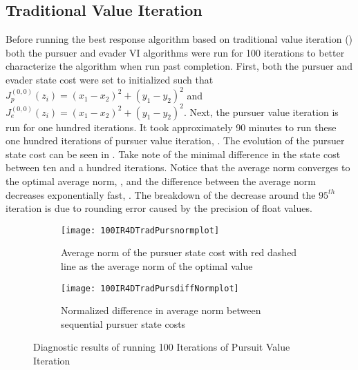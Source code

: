 \subsection{Traditional Value Iteration}
Before running the best response algorithm based on traditional value iteration () both the pursuer and evader VI algorithms were run for 100 iterations to better characterize the algorithm when run past completion. First, both the pursuer and evader state cost were set to initialized such that $J^{(0,0)}_p(z_i) = (x_1-x_2)^2+(y_1-y_2)^2$ and $J^{(0,0)}_e(z_i) = (x_1-x_2)^2+(y_1-y_2)^2$. Next, the pursuer value iteration is run for one hundred iterations. It took approximately 90 minutes to run these one hundred iterations of pursuer value iteration, . The evolution of the pursuer state cost can be seen  in . Take note of the minimal difference in the state cost between ten and a hundred iterations. Notice that the average norm converges to the optimal average norm, , and the difference between the average norm decreases exponentially fast, . The breakdown of the decrease around the $95^{th}$ iteration is due to rounding error caused by the precision of float values.  
\begin{figure}[h!]
\centering
\begin{subfigure}[t]{0.475\textwidth}
	\centering
	\texttt{[image: 100IR4DTradPursnormplot]}
	\caption{Average norm of the pursuer state cost with red dashed line as the average norm of the optimal value}
	\label{100IR4DTnp}
\end{subfigure}
\hfill
\begin{subfigure}[t]{0.475\textwidth}
	\centering
	\texttt{[image: 100IR4DTradPursdiffNormplot]}
	\caption{Normalized difference in average norm between sequential pursuer state costs}
	\label{100IR4DTdnp}
\end{subfigure}
\caption{Diagnostic results of running 100 Iterations of Pursuit Value Iteration}
\label{100IR4DTdiag}
\end{figure} 
